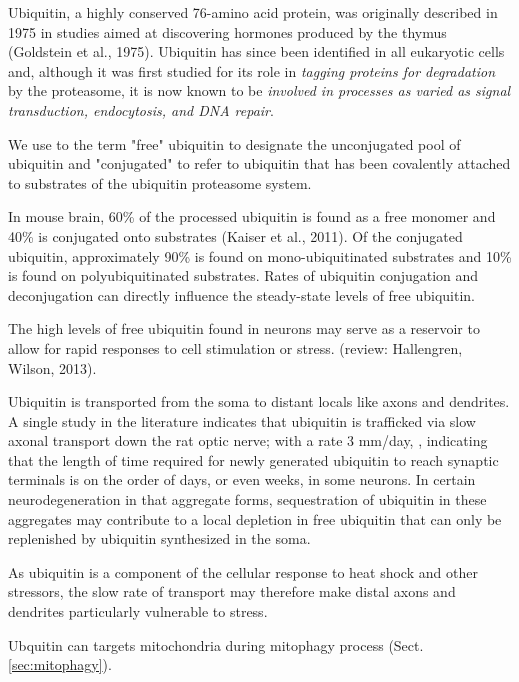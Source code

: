 Ubiquitin, a highly conserved 76-amino acid protein, was originally described in
1975 in studies aimed at discovering hormones produced by the thymus (Goldstein
et al., 1975). Ubiquitin has since been identified in all eukaryotic cells and,
although it was first studied for its role in {\it tagging proteins for
degradation} by the proteasome, it is now known to be {\it involved in processes
as varied as signal transduction, endocytosis, and DNA repair}.

 We use to the term "free" ubiquitin to designate the unconjugated pool of
ubiquitin and "conjugated" to refer to ubiquitin that has been covalently
attached to substrates of the ubiquitin proteasome system.

In mouse brain, 60\% of the processed ubiquitin is found as a free monomer and
40\% is conjugated onto substrates (Kaiser et al., 2011).
Of the conjugated ubiquitin, approximately 90\% is found on mono-ubiquitinated
substrates and 10\% is found on polyubiquitinated substrates.
Rates of ubiquitin conjugation and deconjugation can directly influence the
steady-state levels of free ubiquitin. 

The high levels of free ubiquitin found in neurons may serve as a reservoir to
allow for rapid responses to cell stimulation or stress. (review: Hallengren,
Wilson, 2013).

Ubiquitin is transported from the soma to distant locals like axons and
dendrites. A single study in the literature indicates that ubiquitin is
trafficked via slow axonal transport down the rat optic nerve; with a rate 3
mm/day, , indicating that the length of time required for newly generated
ubiquitin to reach synaptic terminals is on the order of days, or even weeks, in
some neurons. In certain neurodegeneration in that aggregate forms,
sequestration of ubiquitin in these aggregates may contribute to a local
depletion in free ubiquitin that can only be replenished by ubiquitin
synthesized in the soma.

As ubiquitin is a component of the cellular response to heat shock and other
stressors, the slow rate of transport may therefore make distal axons and
dendrites particularly vulnerable to stress.

Ubquitin can targets mitochondria during mitophagy process (Sect.\ref{sec:mitophagy}).





 

